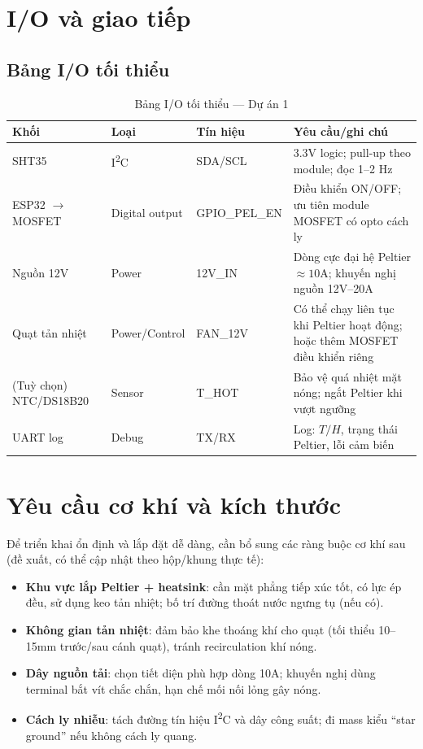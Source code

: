 \documentclass[12pt,a4paper]{report}
\begin{document}
\section{I/O và giao tiếp}
\subsection{Bảng I/O tối thiểu}
\begin{table}[H]
\centering
\caption{Bảng I/O tối thiểu --- Dự án 1}
\begin{tabular}{|p{3.2cm}|p{2.2cm}|p{3.4cm}|p{6.2cm}|}
\hline
\textbf{Khối} & \textbf{Loại} & \textbf{Tín hiệu} & \textbf{Yêu cầu/ghi chú}\\
\hline
SHT35 & I\textsuperscript{2}C & SDA/SCL & 3.3V logic; pull-up theo module; đọc 1--2 Hz\\
\hline
ESP32 $\rightarrow$ MOSFET & Digital output & GPIO\_PEL\_EN & Điều khiển ON/OFF; ưu tiên module MOSFET có opto cách ly\\
\hline
Nguồn 12V & Power & 12V\_IN & Dòng cực đại hệ Peltier $\approx 10$A; khuyến nghị nguồn 12V--20A\\
\hline
Quạt tản nhiệt & Power/Control & FAN\_12V & Có thể chạy liên tục khi Peltier hoạt động; hoặc thêm MOSFET điều khiển riêng\\
\hline
(Tuỳ chọn) NTC/DS18B20 & Sensor & T\_HOT & Bảo vệ quá nhiệt mặt nóng; ngắt Peltier khi vượt ngưỡng\\
\hline
UART log & Debug & TX/RX & Log: $T/H$, trạng thái Peltier, lỗi cảm biến\\
\hline
\end{tabular}
\end{table}

\section{Yêu cầu cơ khí và kích thước}
Để triển khai ổn định và lắp đặt dễ dàng, cần bổ sung các ràng buộc cơ khí sau (đề xuất, có thể cập nhật theo hộp/khung thực tế):
\begin{itemize}
  \item \textbf{Khu vực lắp Peltier + heatsink}: cần mặt phẳng tiếp xúc tốt, có lực ép đều, sử dụng keo tản nhiệt; bố trí đường thoát nước ngưng tụ (nếu có).
  \item \textbf{Không gian tản nhiệt}: đảm bảo khe thoáng khí cho quạt (tối thiểu 10--15mm trước/sau cánh quạt), tránh recirculation khí nóng.
  \item \textbf{Dây nguồn tải}: chọn tiết diện phù hợp dòng 10A; khuyến nghị dùng terminal bắt vít chắc chắn, hạn chế mối nối lỏng gây nóng.
  \item \textbf{Cách ly nhiễu}: tách đường tín hiệu I\textsuperscript{2}C và dây công suất; đi mass kiểu ``star ground'' nếu không cách ly quang.
\end{itemize}
\end{document}
